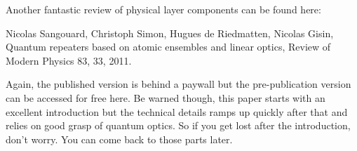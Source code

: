 Another fantastic review of physical layer components can be found here:

Nicolas Sangouard, Christoph Simon, Hugues de Riedmatten, Nicolas Gisin, Quantum repeaters based on atomic ensembles and linear optics, Review of Modern Physics 83, 33, 2011.

Again, the published version is behind a paywall but the pre-publication version can be accessed for free here. Be warned though, this paper starts with an excellent introduction but the technical details ramps up quickly after that and relies on good grasp of quantum optics. So if you get lost after the introduction, don’t worry. You can come back to those parts later.
